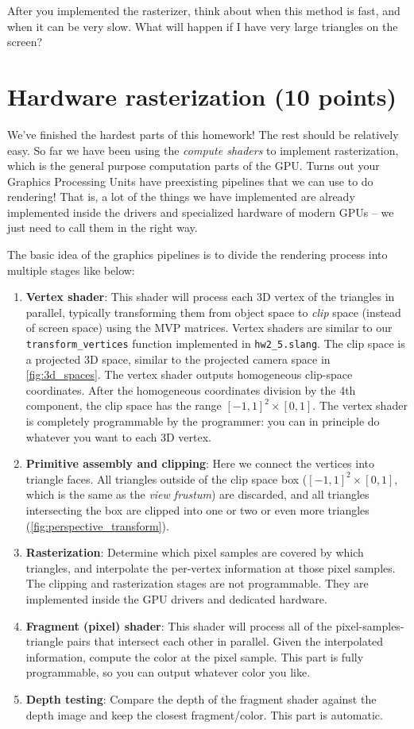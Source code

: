 After you implemented the rasterizer, think about when this method is fast, and when it can be very slow. What will happen if I have very large triangles on the screen?

\section{Hardware rasterization (10 points)}

We've finished the hardest parts of this homework! The rest should be relatively easy. So far we have been using the \emph{compute shaders} to implement rasterization, which is the general purpose computation parts of the GPU. Turns out your Graphics Processing Units have preexisting pipelines that we can use to do rendering! That is, a lot of the things we have implemented are already implemented inside the drivers and specialized hardware of modern GPUs -- we just need to call them in the right way.

The basic idea of the graphics pipelines is to divide the rendering process into multiple stages like below:
\begin{enumerate}
    \item \textbf{Vertex shader}: This shader will process each 3D vertex of the triangles in parallel, typically transforming them from object space to \emph{clip} space (instead of screen space) using the MVP matrices. Vertex shaders are similar to our \lstinline{transform_vertices} function implemented in \lstinline{hw2_5.slang}. The clip space is a projected 3D space, similar to the projected camera space in \cref{fig:3d_spaces}. The vertex shader outputs homogeneous clip-space coordinates. After the homogeneous coordinates division by the 4th component, the clip space has the range $[-1, 1]^2 \times [0, 1]$. The vertex shader is completely programmable by the programmer: you can in principle do whatever you want to each 3D vertex.
    \item \textbf{Primitive assembly and clipping}: Here we connect the vertices into triangle faces. All triangles outside of the clip space box ($[-1, 1]^2 \times [0, 1]$, which is the same as the \emph{view frustum}) are discarded, and all triangles intersecting the box are clipped into one or two or even more triangles (\cref{fig:perspective_transform}). 
    \item \textbf{Rasterization}: Determine which pixel samples are covered by which triangles, and interpolate the per-vertex information at those pixel samples. The clipping and rasterization stages are not programmable. They are implemented inside the GPU drivers and dedicated hardware.
    \item \textbf{Fragment (pixel) shader}: This shader will process all of the pixel-samples-triangle pairs that intersect each other in parallel. Given the interpolated information, compute the color at the pixel sample. This part is fully programmable, so you can output whatever color you like.
    \item \textbf{Depth testing}: Compare the depth of the fragment shader against the depth image and keep the closest fragment/color. This part is automatic.
\end{enumerate}

